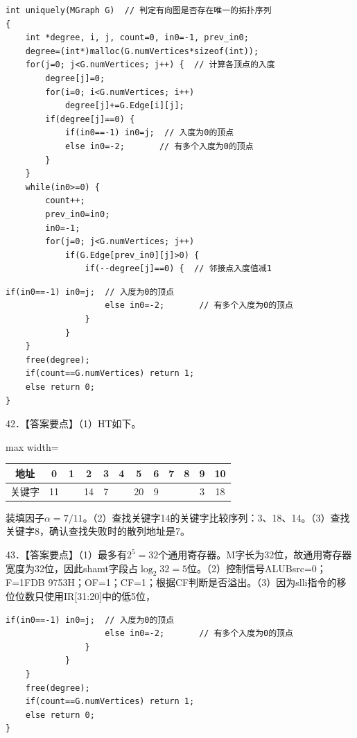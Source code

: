 \documentclass[UTF8,11pt]{ctexart}
\begin{document}
\begin{Verbatim}[breaklines,breakanywhere,fontsize=\small]
int uniquely(MGraph G)  // 判定有向图是否存在唯一的拓扑序列
{
    int *degree, i, j, count=0, in0=-1, prev_in0;
    degree=(int*)malloc(G.numVertices*sizeof(int));
    for(j=0; j<G.numVertices; j++) {  // 计算各顶点的入度
        degree[j]=0;
        for(i=0; i<G.numVertices; i++)
            degree[j]+=G.Edge[i][j];
        if(degree[j]==0) {
            if(in0==-1) in0=j;  // 入度为0的顶点
            else in0=-2;       // 有多个入度为0的顶点
        }
    }
    while(in0>=0) {
        count++;
        prev_in0=in0;
        in0=-1;
        for(j=0; j<G.numVertices; j++)
            if(G.Edge[prev_in0][j]>0) {
                if(--degree[j]==0) {  // 邻接点入度值减1
\end{Verbatim}

\begin{Verbatim}[breaklines,breakanywhere,fontsize=\small]
                    if(in0==-1) in0=j;  // 入度为0的顶点
                    else in0=-2;       // 有多个入度为0的顶点
                }
            }
    }
    free(degree);
    if(count==G.numVertices) return 1;
    else return 0;
}
\end{Verbatim}

42．【答案要点】（1）HT如下。


\begin{center}\begin{adjustbox}{max width=\linewidth}\begin{tabular}{|c|c|c|c|c|c|c|c|c|c|c|c|}\hline
地址 & 0 & 1 & 2 & 3 & 4 & 5 & 6 & 7 & 8 & 9 & 10\\\hline
关键字 & 11 &  & 14 & 7 &  & 20 & 9 &  &  & 3 & 18\\\hline\end{tabular}\end{adjustbox}\end{center}

装填因子\(\displaystyle \alpha=7/11\)。（2）查找关键字14的关键字比较序列：3、18、14。（3）查找关键字8，确认查找失败时的散列地址是7。


43．【答案要点】（1）最多有\(\displaystyle 2^5=32\)个通用寄存器。M字长为32位，故通用寄存器宽度为32位，因此shamt字段占\(\displaystyle \log_2 32=5\)位。（2）控制信号ALUBsrc=0；F=1FDB 9753H；OF=1；CF=1；根据CF判断是否溢出。（3）因为slli指令的移位位数只使用IR[31:20]中的低5位，


\begin{Verbatim}[breaklines,breakanywhere,fontsize=\small]
                    if(in0==-1) in0=j;  // 入度为0的顶点
                    else in0=-2;       // 有多个入度为0的顶点
                }
            }
    }
    free(degree);
    if(count==G.numVertices) return 1;
    else return 0;
}
\end{Verbatim}
\end{document}
